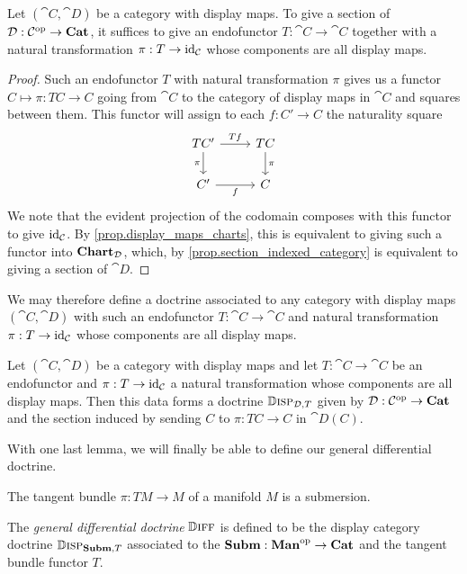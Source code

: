 \documentclass[DynamicalBook]{subfiles}
\begin{document}
\begin{corollary}
Let $(\cat{C}, \cat{D})$ be a category with display maps. To give a section of
$\mathcal{D} : \mathcal{C}^{\textnormal{op}} \to \textbf{Cat}$, it suffices to give an endofunctor $T :
\cat{C} \to \cat{C}$ together with a natural transformation $\pi : T \to
\mathrm{id}_{\mathcal{C}}$ whose components are all display maps.
\end{corollary}
\begin{proof}
Such an endofunctor $T$ with natural transformation $\pi$ gives us a functor $C
\mapsto \pi : TC \to C$ going from $\cat{C}$ to the category of display maps in
$\cat{C}$ and squares between them. This functor will assign to each $f : C' \to
C$ the naturality square 
\[
\begin{tikzcd}
TC' \arrow[d, "\pi"'] \arrow[r, "Tf"] & TC \arrow[d, "\pi"] \\
C' \arrow[r, "f"']                                & C
\end{tikzcd}
\]
We note that the evident projection of the codomain composes with this functor
to give $\mathrm{id}_{\mathcal{C}}$. By \cref{prop.display_maps_charts}, this is equivalent
to giving such a functor into $\textbf{Chart}_{\mathcal{D}}$, which, by
\cref{prop.section_indexed_category} is equivalent to giving a section of
$\cat{D}$.
\end{proof}

We may therefore define a doctrine associated to any category with display maps
$(\cat{C}, \cat{D})$ with such an endofunctor $T : \cat{C} \to \cat{C}$ and
natural transformation $\pi : T \to \mathrm{id}_{\mathcal{C}}$ whose components are all
display maps.

\begin{definition}
Let $(\cat{C}, \cat{D})$ be a category with display maps and let $T : \cat{C}
\to \cat{C}$ be an endofunctor and
$\pi : T \to \mathrm{id}_{\mathcal{C}}$ a natural transformation whose components are all
display maps. Then this data forms a doctrine $\mathbb{D}\textsc{isp}_{\mathcal{D}, T}$ given by $\mathcal{D} : \mathcal{C}^{\textnormal{op}} \to
\textbf{Cat}$ and the section induced by sending $C$ to $\pi : TC \to C$ in $\cat{D}(C)$.
\end{definition}

With one last lemma, we will finally be able to define our general differential doctrine.
\begin{lemma}
The tangent bundle $\pi : TM \to M$ of a manifold $M$ is a submersion.
\end{lemma}

\begin{definition}\label{def.general_diff_doctrine}
The \emph{general differential doctrine} $\mathbb{D}\textsc{iff}$ is defined to be the display
category doctrine
$\mathbb{D}\textsc{isp}_{\textbf{Subm}, T}$ associated to the $\textbf{Subm} : \textbf{Man}^{\textnormal{op}} \to
\textbf{Cat}$ and the tangent bundle functor $T$.
\end{definition}
\end{document}
